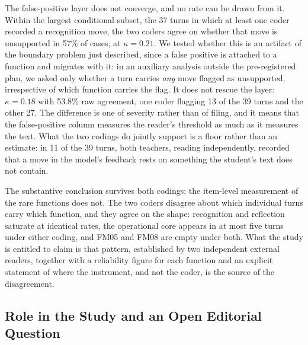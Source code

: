 \documentclass{sbc2023}%
\begin{document}
The false-positive layer does not converge, and no rate can be drawn from it. Within the largest conditional subset, the 37 turns in which at least one coder recorded a recognition move, the two coders agree on whether that move is unsupported in 57\% of cases, at $\kappa = 0.21$. We tested whether this is an artifact of the boundary problem just described, since a false positive is attached to a function and migrates with it: in an auxiliary analysis outside the pre-registered plan, we asked only whether a turn carries \textit{any} move flagged as unsupported, irrespective of which function carries the flag. It does not rescue the layer: $\kappa = 0.18$ with 53.8\% raw agreement, one coder flagging 13 of the 39 turns and the other 27. The difference is one of severity rather than of filing, and it means that the false-positive column measures the reader's threshold as much as it measures the text. What the two codings do jointly support is a floor rather than an estimate: in 11 of the 39 turns, both teachers, reading independently, recorded that a move in the model's feedback rests on something the student's text does not contain.

The substantive conclusion survives both codings; the item-level measurement of the rare functions does not. The two coders disagree about which individual turns carry which function, and they agree on the shape: recognition and reflection saturate at identical rates, the operational core appears in at most five turns under either coding, and FM05 and FM08 are empty under both. What the study is entitled to claim is that pattern, established by two independent external readers, together with a reliability figure for each function and an explicit statement of where the instrument, and not the coder, is the source of the disagreement.

\subsection{Role in the Study and an Open Editorial Question}
\label{sec:fm-role}
\end{document}
